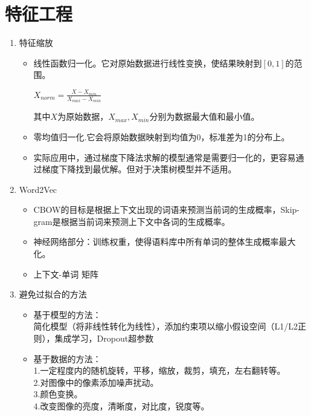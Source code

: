 \chapter{特征工程}
\setlength{\parskip}{6pt}
\begin{enumerate}
	\item 特征缩放
	\begin{itemize}
		\item 线性函数归一化。它对原始数据进行线性变换，使结果映射到$[0,1]$的范围。\\
		\begin{large}
			$X_{norm}=\frac{X-X_{min}}{X_{max}-X_{min}}$\\
		\end{large}
		其中$X$为原始数据，$X_{max}, X_{min}$分别为数据最大值和最小值。
		\item 零均值归一化.它会将原始数据映射到均值为0，标准差为1的分布上。\\
		\item 实际应用中，通过梯度下降法求解的模型通常是需要归一化的，更容易通过梯度下降找到最优解。但对于决策树模型并不适用。\\
	\end{itemize}
	\item Word2Vec
	\begin{itemize}
		\item CBOW的目标是根据上下文出现的词语来预测当前词的生成概率，Skip-gram是根据当前词来预测上下文中各词的生成概率。
		\item 神经网络部分：训练权重，使得语料库中所有单词的整体生成概率最大化。
		\item 上下文-单词 矩阵
	\end{itemize}
	\item 避免过拟合的方法
	\begin{itemize}
		\item 基于模型的方法：\\
		 简化模型（将非线性转化为线性），添加约束项以缩小假设空间（L1/L2正则），集成学习，Dropout超参数
		\item 基于数据的方法：\\
		1.一定程度内的随机旋转，平移，缩放，裁剪，填充，左右翻转等。\\
		2.对图像中的像素添加噪声扰动。\\
		3.颜色变换。\\
		4.改变图像的亮度，清晰度，对比度，锐度等。\\
	\end{itemize}
\end{enumerate}
